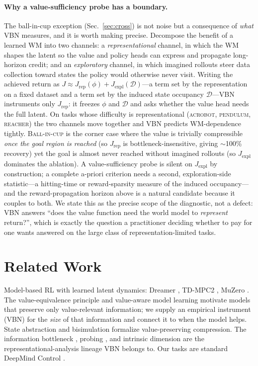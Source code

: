 \documentclass[letterpaper]{article}
\begin{document}
\paragraph{Why a value-sufficiency probe has a boundary.}
The ball-in-cup exception (Sec.~\ref{sec:cross}) is not noise but a consequence
of \emph{what} VBN measures, and it is worth making precise. Decompose the
benefit of a learned WM into two channels: a \emph{representational} channel,
in which the WM shapes the latent so the value and policy heads can express and
propagate long-horizon credit; and an \emph{exploratory} channel, in which
imagined rollouts steer data collection toward states the policy would
otherwise never visit. Writing the achieved return as
$J \approx J_{\text{rep}}(\phi) + J_{\text{expl}}(\mathcal{D})$---a term set by
the representation on a fixed dataset and a term set by the induced state
occupancy $\mathcal{D}$---VBN instruments only $J_{\text{rep}}$: it freezes
$\phi$ and $\mathcal{D}$ and asks whether the value head needs the full latent.
On tasks whose difficulty is representational (\textsc{acrobot},
\textsc{pendulum}, \textsc{reacher}) the two channels move together and VBN
predicts WM-dependence tightly. \textsc{Ball-in-cup} is the corner case where
the value is trivially compressible \emph{once the goal region is reached}
(so $J_{\text{rep}}$ is bottleneck-insensitive, giving $\sim$100\% recovery)
yet the goal is almost never reached without imagined rollouts (so
$J_{\text{expl}}$ dominates the ablation). A value-sufficiency probe is silent
on $J_{\text{expl}}$ by construction; a complete a-priori criterion needs a
second, exploration-side statistic---a hitting-time or reward-sparsity measure
of the induced occupancy---and the reward-propagation horizon above is a
natural candidate because it couples to both. We state this as the precise
scope of the diagnostic, not a defect: VBN answers ``does the value function
need the world model to \emph{represent} return?'', which is exactly the
question a practitioner deciding whether to pay for one wants answered on the
large class of representation-limited tasks.

\section{Related Work}
Model-based RL with learned latent dynamics: Dreamer
\cite{hafner2023dreamerv3}, TD-MPC2 \cite{hansen2024tdmpc2}, MuZero
\cite{schrittwieser2020muzero}. The value-equivalence principle
\cite{grimm2020value} and value-aware model learning motivate models that
preserve only value-relevant information; we supply an empirical instrument
(VBN) for the \emph{size} of that information and connect it to when the model
helps. State abstraction \cite{li2006abstraction} and bisimulation
\cite{zhang2021dbc} formalize value-preserving compression. The information
bottleneck \cite{tishby1999ib,tishby2015dl}, probing \cite{alain2016probes},
and intrinsic dimension \cite{li2018intrinsic} are the representational-analysis
lineage VBN belongs to. Our tasks are standard DeepMind Control
\cite{tassa2018dmc}.
\end{document}
